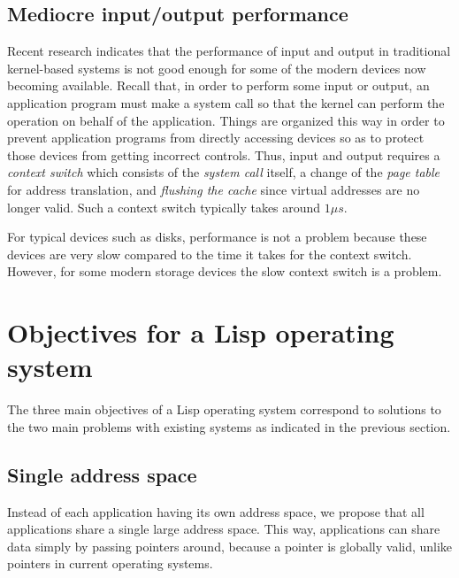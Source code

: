\subsection{Mediocre input/output performance}

Recent research \cite{Barroso:2017:AKM:3069398.3015146} indicates that
the performance of input and output in traditional kernel-based
systems is not good enough for some of the modern devices now becoming
available.  Recall that, in order to perform some input or output, an
application program must make a system call so that the kernel can
perform the operation on behalf of the application.  Things are
organized this way in order to prevent application programs from
directly accessing devices so as to protect those devices from getting
incorrect controls.  Thus, input and output requires a \emph{context
  switch} which consists of the \emph{system call} itself, a change of
the \emph{page table} for address translation, and \emph{flushing the
  cache} since virtual addresses are no longer valid.  Such a context
switch typically takes around $1 \mu s$.

For typical devices such as disks, performance is not a problem
because these devices are very slow compared to the time it takes for
the context switch.  However, for some modern storage devices the slow
context switch is a problem.

\section{Objectives for a Lisp operating system}

The three main objectives of a Lisp operating system correspond to
solutions to the two main problems with existing systems as indicated
in the previous section.

\subsection{Single address space}

Instead of each application having its own address space, we propose
that all applications share a single large address space.  This way,
applications can share data simply by passing pointers around,
because a pointer is globally valid, unlike pointers in current
operating systems. 

